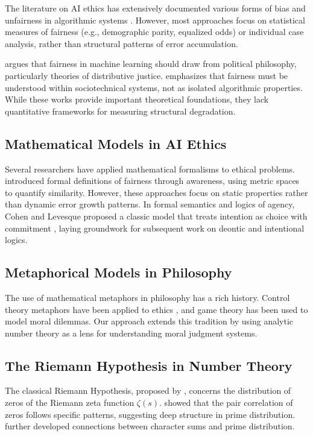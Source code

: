 \documentclass[12pt,a4paper]{article}
\theoremstyle{definition}
\theoremstyle{remark}
\begin{document}
The literature on AI ethics has extensively documented various forms of bias and unfairness in algorithmic systems \citep{mehrabi2021,barocas2016,oneil2016}. However, most approaches focus on statistical measures of fairness (e.g., demographic parity, equalized odds) or individual case analysis, rather than structural patterns of error accumulation.

\citet{binns2018} argues that fairness in machine learning should draw from political philosophy, particularly theories of distributive justice. \citet{selbst2019} emphasizes that fairness must be understood within sociotechnical systems, not as isolated algorithmic properties. While these works provide important theoretical foundations, they lack quantitative frameworks for measuring structural degradation.

\subsection{Mathematical Models in AI Ethics}

Several researchers have applied mathematical formalisms to ethical problems. \citet{dwork2012} introduced formal definitions of fairness through awareness, using metric spaces to quantify similarity. However, these approaches focus on static properties rather than dynamic error growth patterns. In formal semantics and logics of agency, Cohen and Levesque proposed a classic model that treats intention as choice with commitment \citep{cohen1990}, laying groundwork for subsequent work on deontic and intentional logics.

\subsection{Metaphorical Models in Philosophy}

The use of mathematical metaphors in philosophy has a rich history. Control theory metaphors have been applied to ethics \citep{floridi2018}, and game theory has been used to model moral dilemmas. Our approach extends this tradition by using analytic number theory as a lens for understanding moral judgment systems.

\subsection{The Riemann Hypothesis in Number Theory}

The classical Riemann Hypothesis, proposed by \citet{riemann1859}, concerns the distribution of zeros of the Riemann zeta function $\zeta(s)$. \citet{montgomery1973} showed that the pair correlation of zeros follows specific patterns, suggesting deep structure in prime distribution. \citet{granville2007} further developed connections between character sums and prime distribution.
\end{document}
